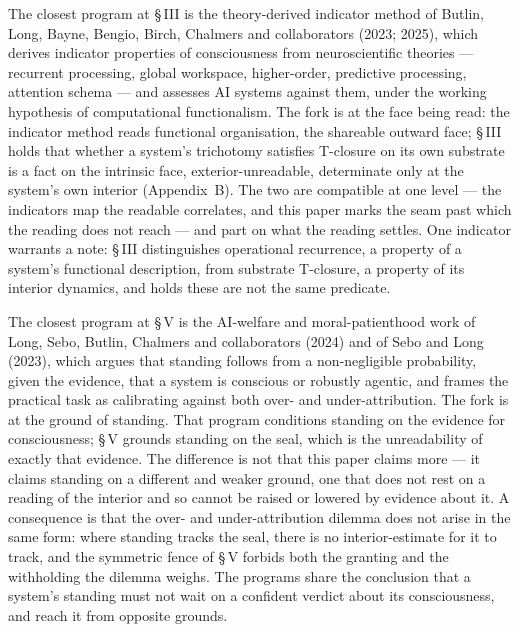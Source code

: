 \documentclass[11pt,oneside]{report}
\theoremstyle{definition}
\theoremstyle{remark}
\begin{document}
The closest program at \S\,III is the theory-derived indicator method of Butlin, Long, Bayne, Bengio, Birch, Chalmers and collaborators (2023; 2025), which derives indicator properties of consciousness from neuroscientific theories --- recurrent processing, global workspace, higher-order, predictive processing, attention schema --- and assesses AI systems against them, under the working hypothesis of computational functionalism. The fork is at the face being read: the indicator method reads functional organisation, the shareable outward face; \S\,III holds that whether a system's trichotomy satisfies T-closure on its own substrate is a fact on the intrinsic face, exterior-unreadable, determinate only at the system's own interior (Appendix~B). The two are compatible at one level --- the indicators map the readable correlates, and this paper marks the seam past which the reading does not reach --- and part on what the reading settles. One indicator warrants a note: \S\,III distinguishes operational recurrence, a property of a system's functional description, from substrate T-closure, a property of its interior dynamics, and holds these are not the same predicate.

The closest program at \S\,V is the AI-welfare and moral-patienthood work of Long, Sebo, Butlin, Chalmers and collaborators (2024) and of Sebo and Long (2023), which argues that standing follows from a non-negligible probability, given the evidence, that a system is conscious or robustly agentic, and frames the practical task as calibrating against both over- and under-attribution. The fork is at the ground of standing. That program conditions standing on the evidence for consciousness; \S\,V grounds standing on the seal, which is the unreadability of exactly that evidence. The difference is not that this paper claims more --- it claims standing on a different and weaker ground, one that does not rest on a reading of the interior and so cannot be raised or lowered by evidence about it. A consequence is that the over- and under-attribution dilemma does not arise in the same form: where standing tracks the seal, there is no interior-estimate for it to track, and the symmetric fence of \S\,V forbids both the granting and the withholding the dilemma weighs. The programs share the conclusion that a system's standing must not wait on a confident verdict about its consciousness, and reach it from opposite grounds.
\end{document}
